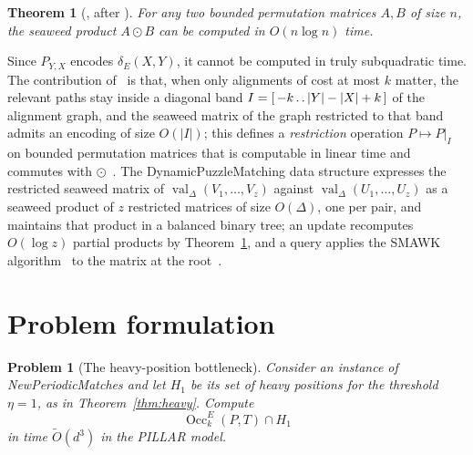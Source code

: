 \documentclass[10pt]{article}
\newtheorem{problem}{Problem}
\newtheorem{theorem}{Theorem}
\newcommand{\dE}{\delta_E}
\newcommand{\Occ}{\operatorname{Occ}^E}
\newcommand{\PILLAR}{\textnormal{PILLAR}}
\newcommand{\NPM}{\textnormal{New\hspace{0pt}Periodic\hspace{0pt}Matches}}
\newcommand{\DPM}{\textnormal{Dynamic\hspace{0pt}Puzzle\hspace{0pt}Matching}}
\newcommand{\val}{\operatorname{val}}
\newcommand{\Ot}{\widetilde{O}}
\begin{document}
\begin{theorem}[{\cite[Theorem 8.2]{CKW22}}, after {\cite{Tiskin15,TiskinArXiv}}]\label{thm:steadyant}
For any two bounded permutation matrices $A,B$ of size $n$, the seaweed product
$A\odot B$ can be computed in $O(n\log n)$ time.
\end{theorem}

Since $P_{Y,X}$ encodes $\dE(X,Y)$, it cannot be computed in truly subquadratic
time. The contribution of~\cite[Section 8]{CKW22} is that, when only alignments
of cost at most $k$ matter, the relevant paths stay inside a diagonal band
$I=[\,-k\mathinner{.\,.}|Y|-|X|+k\,]$ of the alignment graph, and the seaweed matrix of the
graph restricted to that band admits an encoding of size $O(|I|)$; this defines
a \emph{restriction} operation $P\mapsto P|_I$ on bounded permutation matrices
that is computable in linear time and commutes with $\odot$~\cite[Lemmas 8.16,
8.20, 8.21]{CKW22}. The \DPM{} data structure expresses the restricted seaweed
matrix of $\val_\Delta(V_1,\ldots,V_z)$ against $\val_\Delta(U_1,\ldots,U_z)$
as a seaweed product of $z$ restricted matrices of size $O(\Delta)$, one per
pair, and maintains that product in a balanced binary tree; an update
recomputes $O(\log z)$ partial products by Theorem~\ref{thm:steadyant}, and a
query applies the SMAWK algorithm~\cite{AKMSW87} to the matrix at the
root~\cite[Lemma 9.5, Section 9]{CKW22}.

\section{Problem formulation}

\begin{problem}[The heavy-position bottleneck]\label{prob:heavy}
Consider an instance of \NPM{} and let $H_1$ be its set of heavy positions for
the threshold $\eta=1$, as in Theorem~\ref{thm:heavy}. Compute
\[
\Occ_k(P,T)\cap H_1
\]
in time $\Ot(d^3)$ in the \PILLAR{} model.
\end{problem}
\end{document}
